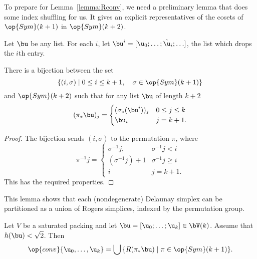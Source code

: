 To prepare for Lemma~\ref{lemma:Rconv}, we need a preliminary lemma that
does some index shuffling for us.  It gives an  explicit representatives of the
cosets of $\op{Sym}(k+1)$ in $\op{Sym}(k+2)$.


\begin{definition}
Let $\bu$ be any list.
For each $i$,  let
$\bu^i = [\u_0;\ldots;\hat\u_i;\ldots]$, the list which drops the $i$th entry.
\end{definition}

\begin{lemma}\label{lemma:coset-bijection} 
There is a bijection between the set 
\begin{displaymath} 
\{(i,\sigma)\mid 0\le i\le k+1,\quad \sigma\in \op{Sym}(k+1)\}
\end{displaymath}
and $\op{Sym}(k+2)$ such that for any list $\bu$ of length $k+2$
\[
(\pi_*\bu)_j = \begin{cases} (\sigma_*(\bu^i))_j&0\le j \le k\\
  \bu_i & j=k+1.
\end{cases}
\]
\end{lemma}

\begin{proof} 
The bijection sends $(i,\sigma)$ to the permutation $\pi$, where
\begin{displaymath} 
\pi^{-1} j = \begin{cases} 
\sigma^{-1} j, & \sigma^{-1} j<i\\
(\sigma^{-1}j)+1 & \sigma^{-1} j \ge i\\
i& j=k+1.
\end{cases}
\end{displaymath}
This has the required properties.
\end{proof}

This lemma shows that each (nondegenerate) Delaunay simplex can be
partitioned as a union of Rogers simplices, indexed by the permutation
group.

\begin{lemma}\label{lemma:Rconv}  
  Let $V$ be a saturated packing and let $\bu = [\u_0;\ldots;\u_k]\in
  \bV(k)$.  Assume that $h(\bu)<\sqrt2$.  
  Then
\begin{displaymath} 
\op{conv}\{ \u_0,\ldots, \u_k\} = \bigcup \,\{ R(\pi_*\bu) \mid \pi\in \op{Sym}(k+1)\}.
\end{displaymath}
\end{lemma}
%

